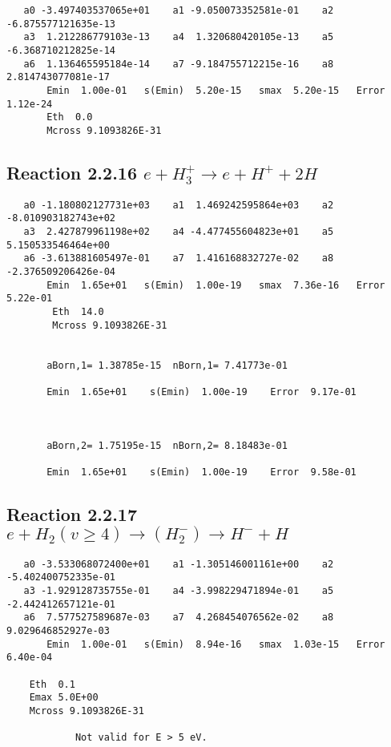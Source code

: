 \documentclass[12pt,dvipdfm]{article}
\begin{document}
\begin{small}\begin{verbatim}
   a0 -3.497403537065e+01    a1 -9.050073352581e-01    a2 -6.875577121635e-13
   a3  1.212286779103e-13    a4  1.320680420105e-13    a5 -6.368710212825e-14
   a6  1.136465595184e-14    a7 -9.184755712215e-16    a8  2.814743077081e-17
       Emin  1.00e-01   s(Emin)  5.20e-15   smax  5.20e-15   Error  1.12e-24
       Eth  0.0
       Mcross 9.1093826E-31
\end{verbatim}\end{small}





\newpage
\subsection{
Reaction 2.2.16 $ e + H_3^+ \rightarrow e + H^+ + 2H$}



\begin{small}\begin{verbatim}
   a0 -1.180802127731e+03    a1  1.469242595864e+03    a2 -8.010903182743e+02
   a3  2.427879961198e+02    a4 -4.477455604823e+01    a5  5.150533546464e+00
   a6 -3.613881605497e-01    a7  1.416168832727e-02    a8 -2.376509206426e-04
       Emin  1.65e+01   s(Emin)  1.00e-19   smax  7.36e-16   Error  5.22e-01
        Eth  14.0
        Mcross 9.1093826E-31


       aBorn,1= 1.38785e-15  nBorn,1= 7.41773e-01

       Emin  1.65e+01    s(Emin)  1.00e-19    Error  9.17e-01



       aBorn,2= 1.75195e-15  nBorn,2= 8.18483e-01

       Emin  1.65e+01    s(Emin)  1.00e-19    Error  9.58e-01

\end{verbatim}\end{small}




\newpage
\subsection{
Reaction 2.2.17 $   e + H_2(v \geq 4) \rightarrow (H_2^-) \rightarrow H^- + H$}



\begin{small}\begin{verbatim}
   a0 -3.533068072400e+01    a1 -1.305146001161e+00    a2 -5.402400752335e-01
   a3 -1.929128735755e-01    a4 -3.998229471894e-01    a5 -2.442412657121e-01
   a6  7.577527589687e-03    a7  4.268454076562e-02    a8  9.029646852927e-03
       Emin  1.00e-01   s(Emin)  8.94e-16   smax  1.03e-15   Error  6.40e-04

    Eth  0.1
    Emax 5.0E+00
    Mcross 9.1093826E-31

            Not valid for E > 5 eV.
\end{verbatim}\end{small}
\end{document}
